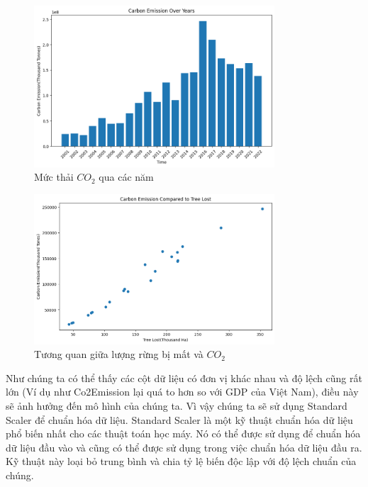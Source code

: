 \documentclass[a4paper,12pt]{report}
\begin{document}
\begin{flushleft}
	\begin{figure}[H]
		\centering
		\includegraphics[width = 0.8\textwidth]{images/carbon_emission_problem3.png}
		\caption{Mức thải $CO_{2}$ qua các năm}
	\end{figure}

	\begin{figure}[H]
		\centering
		\includegraphics[width = 0.8\textwidth]{images/carbon_emission_v_tree_loss_problem3.png}
		\caption{Tương quan giữa lượng rừng bị mất và $CO_{2}$}
	\end{figure}

	Như chúng ta có thể thấy các cột dữ liệu có đơn vị khác nhau và độ lệch cũng rất lớn (Ví dụ như Co2Emission lại quá to hơn so với GDP của Việt Nam), điều này sẽ ảnh hưởng đến mô hình của chúng ta. Vì vậy chúng ta sẽ sử dụng Standard Scaler để chuẩn hóa dữ liệu. Standard Scaler là một kỹ thuật chuẩn hóa dữ liệu phổ biến nhất cho các thuật toán học máy. Nó có thể được sử dụng để chuẩn hóa dữ liệu đầu vào và cũng có thể được sử dụng trong việc chuẩn hóa dữ liệu đầu ra. Kỹ thuật này loại bỏ trung bình và chia tỷ lệ biến độc lập với độ lệch chuẩn của chúng.
	\\[\baselineskip]


\end{flushleft}
\end{document}
